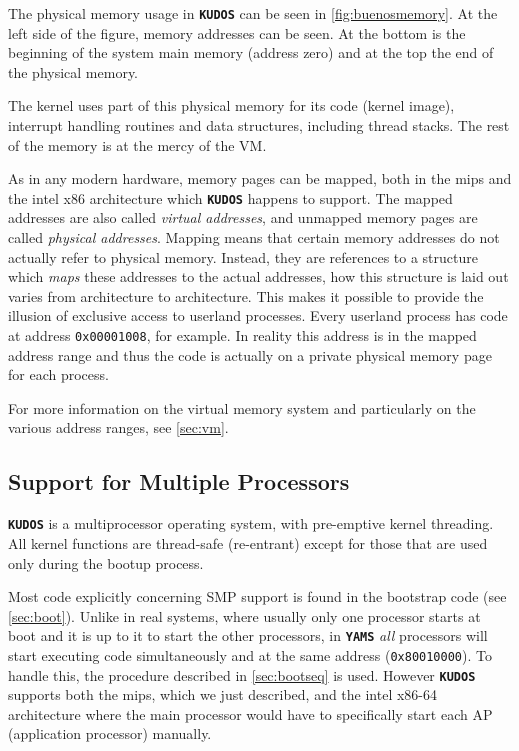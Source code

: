 \documentclass[twoside,a4paper]{report}
\newcommand{\kudos}{\texttt{\textbf{KUDOS}}}
\newcommand{\yams}{\texttt{\textbf{YAMS}}}
\begin{document}
The physical memory usage in \kudos{} can be seen in
\autoref{fig:buenosmemory}. At the left side of the figure, memory
addresses can be seen. At the bottom is the beginning of the system
main memory (address zero) and at the top the end of the physical
memory.

The kernel uses part of this physical memory for its code (kernel
image), interrupt handling routines and data structures, including
thread stacks. The rest of the memory is at the mercy of the VM.

As in any modern hardware, memory pages can be mapped, both in
the mips and the intel x86 architecture which \kudos{} happens to support. 
The mapped addresses are also called \emph{virtual addresses}, and unmapped
memory pages are called \emph{physical addresses}. Mapping means that certain memory
addresses do not actually refer to physical memory. Instead, they are
references to a structure which \emph{maps} these addresses to the
actual addresses, how this structure is laid out varies from architecture to
architecture. This makes it possible to provide the illusion of
exclusive access to userland processes. Every userland process has
code at address \texttt{0x00001008}, for example. In reality this
address is in the mapped address range and thus the code is actually
on a private physical memory page for each process.

For more information on the virtual memory system and particularly on
the various address ranges, see \autoref{sec:vm}.

\subsection{Support for Multiple Processors}
\label{sec:SMP}

\kudos{} is a multiprocessor operating system, with pre-emptive
kernel threading. All kernel functions are thread-safe (re-entrant)
except for those that are used only during the bootup process.

Most code explicitly concerning SMP support is found in the bootstrap
code (see \autoref{sec:boot}). Unlike in real systems, where usually
only one processor starts at boot and it is up to it to start the
other processors, in \yams{} \emph{all} processors will start
executing code simultaneously and at the same address
(\texttt{0x80010000}). To handle this, the procedure described in
\autoref{sec:bootseq} is used.
However \kudos{} supports both the mips, which we just described,
and the intel x86-64 architecture where the main processor would 
have to specifically start each AP (application processor) manually.
\end{document}

